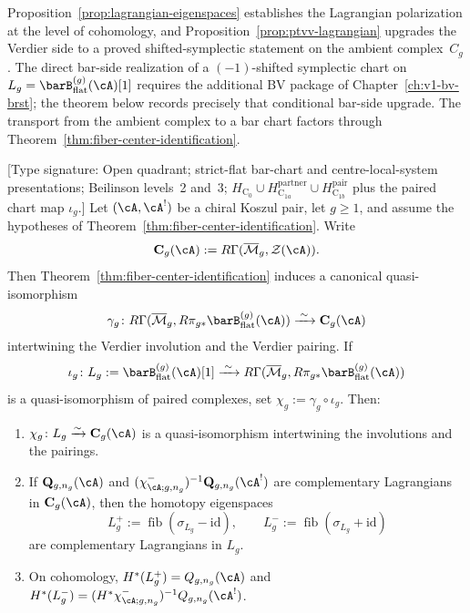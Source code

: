 Proposition~\ref{prop:lagrangian-eigenspaces} establishes the
Lagrangian polarization at the level of cohomology, and
Proposition~\ref{prop:ptvv-lagrangian} upgrades the Verdier side to a
proved shifted-symplectic statement on the ambient complex~$C_g$. The
direct bar-side realization of a $(-1)$-shifted symplectic chart on
$L_g = \barB^{(g)}_{\mathrm{flat}}(\cA)[1]$ requires the
additional BV package of
Chapter~\ref{ch:v1-bv-brst}; the theorem below records precisely that
conditional bar-side upgrade. The transport from the ambient complex to a
bar chart factors through Theorem~\ref{thm:fiber-center-identification}.

\begin{lemma}
\label{lem:bar-chart-lagrangian-lift}
\textup{[Type signature: Open quadrant; strict-flat bar-chart and
centre-local-system presentations; Beilinson levels~2 and~3;
\(H_{\mathrm C_0}\cup H_{\mathrm C_{1a}}^{\mathrm{partner}}
\cup H_{\mathrm C_{1b}}^{\mathrm{pair}}\) plus the paired chart map
\(\iota_g\).]}
Let $(\cA, \cA^!)$ be a chiral Koszul pair, let $g \geq 1$, and assume
the hypotheses of Theorem~\ref{thm:fiber-center-identification}.
Write
\[
\mathbf{C}_g(\cA) := R\Gamma(\overline{\mathcal{M}}_g, \mathcal{Z}(\cA)).
\]
Then Theorem~\ref{thm:fiber-center-identification} induces a canonical
quasi-isomorphism
\[
\gamma_g \colon
R\Gamma(\overline{\mathcal{M}}_g, R\pi_{g*}\barB^{(g)}_{\mathrm{flat}}(\cA))
\xrightarrow{\;\sim\;}
\mathbf{C}_g(\cA)
\]
intertwining the Verdier involution and the Verdier pairing. If
\[
\iota_g \colon L_g := \barB^{(g)}_{\mathrm{flat}}(\cA)[1]
\xrightarrow{\;\sim\;}
R\Gamma(\overline{\mathcal{M}}_g, R\pi_{g*}\barB^{(g)}_{\mathrm{flat}}(\cA))
\]
is a quasi-isomorphism of paired complexes, set
$\chi_g := \gamma_g \circ \iota_g$. Then:
\begin{enumerate}[label=\textup{(\roman*)}]
\item $\chi_g \colon L_g \xrightarrow{\sim} \mathbf{C}_g(\cA)$ is a
 quasi-isomorphism intertwining the involutions and the pairings.
\item If $\mathbf{Q}_{g,n_g}(\cA)$ and
 $(\chi^-_{\cA;g,n_g})^{-1}\mathbf{Q}_{g,n_g}(\cA^!)$ are
 complementary Lagrangians in $\mathbf{C}_g(\cA)$, then the
 homotopy eigenspaces
 \[
 L_g^+ := \operatorname{fib}(\sigma_{L_g} - \mathrm{id}),
 \qquad
 L_g^- := \operatorname{fib}(\sigma_{L_g} + \mathrm{id})
 \]
 are complementary Lagrangians in $L_g$.
\item On cohomology,
 $H^*(L_g^+) = Q_{g,n_g}(\cA)$ and
 $H^*(L_g^-) =
 (H^*\chi^-_{\cA;g,n_g})^{-1}Q_{g,n_g}(\cA^!)$.
\end{enumerate}
\end{lemma}

